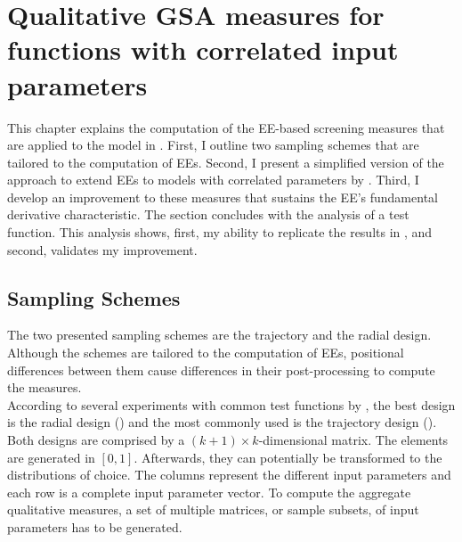 \documentclass[a4paper,12pt]{article}
\begin{document}
\newpage %

\section{Qualitative GSA measures for functions with correlated input parameters}
\thispagestyle{plain} %

This chapter explains the computation of the EE-based screening measures that are applied to the model in \cite{Keane.1994}.
First, I outline two sampling schemes that are tailored to the computation of EEs. Second, I present a simplified version of the approach to extend EEs to models with correlated parameters by \cite{ge2017extending}. Third, I develop an improvement to these measures that sustains the EE's fundamental derivative characteristic. The section concludes with the analysis of a test function. This analysis shows, first, my ability to replicate the results in \cite{ge2017extending}, and second, validates my improvement.


\subsection{Sampling Schemes}

The two presented sampling schemes are the trajectory and the radial design. Although the schemes are tailored to the computation of EEs, positional differences between them cause differences in their post-processing to compute the measures.\\

\noindent
According to several experiments with common test functions by \cite{campolongo2011screening}, the best design is the radial design (\cite{saltelli2002making}) and the most commonly used is the trajectory design (\cite{Morris.1991}).
Both designs are comprised by a $(k + 1) \times k$-dimensional matrix. The elements are generated in $[0,1]$. Afterwards, they can potentially be transformed to the distributions of choice. The columns represent the different input parameters and each row is a complete input parameter vector. To compute the aggregate qualitative measures, a set of multiple matrices, or sample subsets, of input parameters has to be generated.\\
\end{document}
